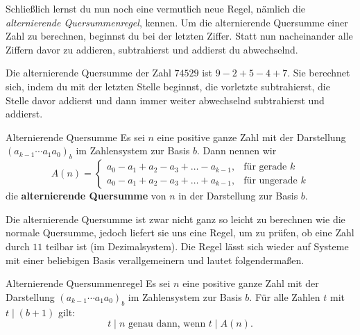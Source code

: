 \documentclass[../../main.tex]{subfiles}
\begin{document}
Schließlich lernst du nun noch eine vermutlich neue Regel, nämlich die \emph{alternierende Quersummenregel}, kennen. Um die alternierende Quersumme einer Zahl zu berechnen, beginnst du bei der letzten Ziffer. Statt nun nacheinander alle Ziffern davor zu addieren, subtrahierst und addierst du abwechselnd.
\begin{example}{}
    Die alternierende Quersumme der Zahl $74529$ ist $9-2+5-4+7$. Sie berechnet sich, indem du mit der letzten Stelle beginnst, die vorletzte subtrahierst, die Stelle davor addierst und dann immer weiter abwechselnd subtrahierst und addierst.
\end{example}
\begin{definition}{Alternierende Quersumme}
    Es sei $n$ eine positive ganze Zahl mit der Darstellung $(a_{k-1}\cdots a_1a_0)_b$ im Zahlensystem zur Basis $b$. Dann nennen wir
    \[A(n)=\begin{cases}
        a_0-a_1+a_2-a_3+\dots-a_{k-1}, &\text{für gerade }k\\
        a_0-a_1+a_2-a_3+\dots+a_{k-1}, &\text{für ungerade }k
    \end{cases}\]
    die \textbf{alternierende Quersumme} von $n$ in der Darstellung zur Basis $b$.
\end{definition}
Die alternierende Quersumme ist zwar nicht ganz so leicht zu berechnen wie die normale Quersumme, jedoch liefert sie uns eine Regel, um zu prüfen, ob eine Zahl durch $11$ teilbar ist (im Dezimalsystem). Die Regel lässt sich wieder auf Systeme mit einer beliebigen Basis verallgemeinern und lautet folgendermaßen.
\begin{theorem}{Alternierende Quersummenregel}
    Es sei $n$ eine positive ganze Zahl mit der Darstellung $(a_{k-1}\cdots a_1a_0)_b$ im Zahlensystem zur Basis $b$. Für alle Zahlen $t$ mit $t\mid (b+1)$ gilt:
    \[t\mid n\text{ genau dann, wenn }t\mid A(n).\]
\end{theorem}
\end{document}
